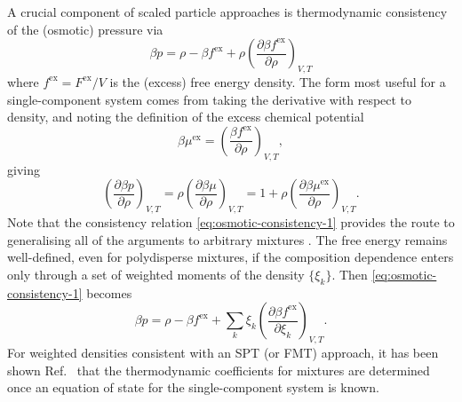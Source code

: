 \documentclass[11pt,twoside]{report}
\begin{document}
A crucial component of scaled particle approaches is thermodynamic consistency of the (osmotic) pressure via
\begin{equation}\label{eq:osmotic-consistency-1}
  \beta p
  =
  \rho - \beta f^\mathrm{ex}
  + \rho \left( \frac{\partial \beta f^\mathrm{ex}}{\partial \rho} \right)_{V,T}
\end{equation}
where $f^\mathrm{ex} = F^\mathrm{ex}/V$ is the (excess) free energy density.
The form most useful for a single-component system comes from taking the derivative with respect to density, and noting the definition of the excess chemical potential
\begin{equation*}
  \beta \mu^\mathrm{ex}
  =
  \left( \frac{\beta f^\mathrm{ex}}{\partial \rho} \right)_{V,T},
\end{equation*}
giving
\begin{equation}\label{eq:osmotic-consistency-2}
    \left( \frac{\partial \beta p}{\partial \rho} \right)_{V,T}
    =
    \rho \left( \frac{\partial \beta \mu}{\partial \rho} \right)_{V,T}
    =
    1 + \rho \left( \frac{\partial \beta \mu^\mathrm{ex}}{\partial \rho} \right)_{V,T}.
\end{equation}
Note that the consistency relation \eqref{eq:osmotic-consistency-1} provides the route to generalising all of the arguments to arbitrary mixtures \cite{RosenfeldPRL1989,SollichAiCP2001,SantosPRE2012}.
The free energy remains well-defined, even for polydisperse mixtures, if the composition dependence enters only through a set of weighted moments of the density $\{\xi_k\}$.
Then \eqref{eq:osmotic-consistency-1} becomes
\begin{equation}\label{eq:osmotic-consistency-3}
  \beta p
  =
  \rho - \beta f^\mathrm{ex}
  + \sum_k
  \xi_k \left( \frac{\partial \beta f^\mathrm{ex}}{\partial \xi_k} \right)_{V,T}.
\end{equation}
For weighted densities consistent with an SPT (or FMT) approach, it has been shown Ref.\ \cite{SantosPRE2012} that the thermodynamic coefficients for mixtures are determined once an equation of state for the single-component system is known.
\end{document}
